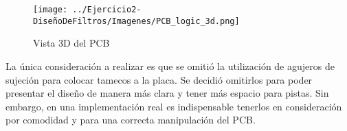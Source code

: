 \begin{figure}[H]
    \centering
    \texttt{[image: ../Ejercicio2-DiseñoDeFiltros/Imagenes/PCB\_logic\_3d.png]}
    \caption{Vista 3D del PCB}
\end{figure}


La única consideración a realizar es que se omitió la utilización de agujeros de sujeción para colocar tamecos a la placa. Se decidió omitirlos 
para poder presentar el diseño de manera más clara y tener más espacio para pistas. Sin embargo, en una implementación real es indispensable tenerlos 
en consideración por comodidad y para una correcta manipulación del PCB.